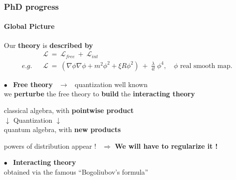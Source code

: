 \documentclass[9pt]{beamer}
\newcommand{\Lcal}{\mathcal{L}}
\begin{document}
\begin{frame}

\frametitle{PhD progress}
\framesubtitle{Global Picture}

\vfill

Our \textbf{theory} is \textbf{described by}
\begin{eqnarray*}
&& \Lcal \ = \ \Lcal_{free} \ + \ \Lcal_{int} \\
e.g. && \Lcal \ = \ \left( \nabla \phi \nabla \phi + m^2 \phi^2 + \xi R \phi^2 \right) \ + \ \frac{\lambda}{4!} \ \phi^4 , \quad \phi \mbox{ real smooth map}.
\end{eqnarray*}

\vfill

$\bullet$ \ \textbf{Free theory} \ $\to$ \ quantization well known \\
\hspace*{8pt} we \textbf{perturbe} the free theory to \textbf{build} the \textbf{interacting theory}
\begin{center}
classical algebra, with \textbf{pointwise product} \\
$\downarrow$ Quantization $\downarrow$ \\
quantum algebra, with \textbf{new products} \\
\end{center}
\hspace*{8pt} powers of distribution appear !  \ $\Rightarrow$ \textbf{We will have to regularize it !} 

\vfill

$\bullet$ \ \textbf{Interacting theory} \\
\hspace*{8pt} obtained via the famous ``Bogoliubov's formula'' \\ 

\vfill

\end{frame}

\end{document}
